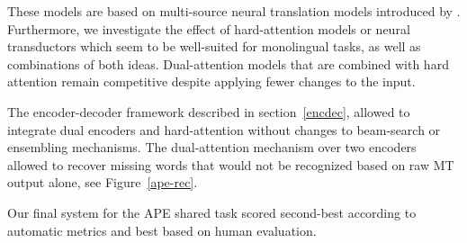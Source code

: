\documentclass[11pt,a4paper]{article}
\begin{document}
These models are based on multi-source neural translation models introduced by . Furthermore, we investigate the effect of hard-attention models or neural transductors \cite{aharoni2016sequence} which seem to be well-suited for monolingual tasks, as well as combinations of both ideas. 
Dual-attention models that are combined with hard attention remain competitive despite applying fewer changes to the input.

The encoder-decoder framework described in section~\ref{encdec}, allowed to integrate dual encoders and hard-attention without changes to beam-search or ensembling mechanisms.
The dual-attention mechanism over two encoders allowed to recover missing words that would not be recognized based on raw MT output alone, see Figure~\ref{ape-rec}.

Our final system for the APE shared task scored second-best according to automatic metrics and best based on human evaluation.



\end{document}
